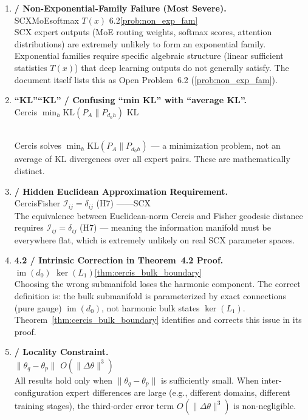 \documentclass{article}
\newcommand{\KL}{\mathrm{KL}}
\newcommand{\Fisher}{\mathcal{I}}
\newcommand{\Lone}{L_1}
\DeclareMathOperator{\im}{im}
\begin{document}
\vspace{0.5em}

\begin{enumerate}[label=\textbf{B\arabic*:}, leftmargin=*, itemsep=0.8em]

    \item \textbf{ / Non-Exponential-Family Failure (Most Severe).} \\
    SCXMoEsoftmax
    $T(x)$
    6.2\ref{prob:non_exp_fam}
    \\[0.3em]
    SCX expert outputs (MoE routing weights, softmax scores, attention distributions)
    are extremely unlikely to form an exponential family. Exponential families require specific
    algebraic structure (linear sufficient statistics $T(x)$) that deep learning outputs do not
    generally satisfy. The document itself lists this as Open Problem~6.2 (\ref{prob:non_exp_fam}).

    \item \textbf{``KL''``KL'' / Confusing ``min KL'' with ``average KL''.} \\
    Cercis $\min_h \KL(P_A \| P_{d_0 h})$ KL
    
    \\[0.3em]
    Cercis solves $\min_h \KL(P_A \| P_{d_0 h})$ — a minimization problem, not an average of
    KL divergences over all expert pairs. These are mathematically distinct.

    \item \textbf{ / Hidden Euclidean Approximation Requirement.} \\
    CercisFisher $\Fisher_{ij} = \delta_{ij}$ (H7)
    ——SCX
    \\[0.3em]
    The equivalence between Euclidean-norm Cercis and Fisher geodesic distance requires
    $\Fisher_{ij} = \delta_{ij}$ (H7) — meaning the information manifold must be everywhere flat,
    which is extremely unlikely on real SCX parameter spaces.

    \item \textbf{4.2 / Intrinsic Correction in Theorem~4.2 Proof.} \\
    $\im(d_0)$ 
     $\ker(\Lone)$\ref{thm:cercis_bulk_boundary}
    \\[0.3em]
    Choosing the wrong submanifold loses the harmonic component. The correct definition is:
    the bulk submanifold is parameterized by exact connections (pure gauge) $\im(d_0)$,
    not harmonic bulk states $\ker(\Lone)$. Theorem~\ref{thm:cercis_bulk_boundary} identifies
    and corrects this issue in its proof.

    \item \textbf{ / Locality Constraint.} \\
     $\|\theta_q - \theta_p\|$ 
     $O(\|\Delta\theta\|^3)$ 
    \\[0.3em]
    All results hold only when $\|\theta_q - \theta_p\|$ is sufficiently small.
    When inter-configuration expert differences are large (e.g., different domains, different
    training stages), the third-order error term $O(\|\Delta\theta\|^3)$ is non-negligible.

\end{enumerate}
\end{document}
